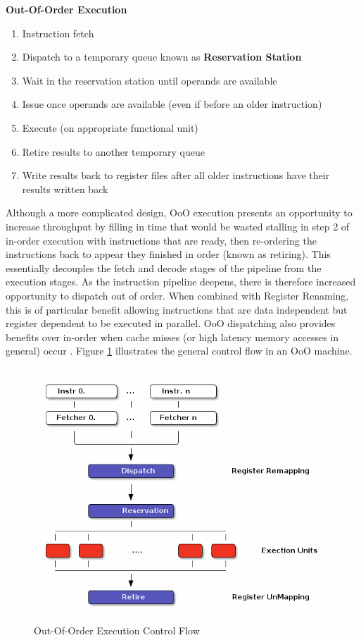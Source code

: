 \documentclass[12pt]{report}
\begin{document}
\newpage

\textbf{Out-Of-Order Execution}
\begin{enumerate}
\item Instruction fetch
\item Dispatch to a temporary queue known as \textbf{Reservation Station}
\item Wait in the reservation station until operands are available
\item Issue once operands are available (even if before an older
instruction)
\item Execute (on appropriate functional unit)
\item Retire results to another temporary queue
\item Write results back to register files after all older instructions have their results written back
\end{enumerate}

Although a more complicated design, OoO execution presents an opportunity to
increase throughput by filling in time that would be wasted stalling in step
2 of in-order execution with instructions that are ready, then re-ordering
the instructions back to appear they finished in order (known as retiring).
This essentially decouples the fetch and decode stages of the pipeline from
the execution stages. As the instruction pipeline deepens, there is therefore
increased opportunity to dispatch out of order. When combined with Register
Renaming, this is of particular benefit allowing instructions that are data
independent but register dependent to be executed in parallel. OoO
dispatching also provides benefits over in-order when cache misses (or high
latency memory accesses in general) occur \parencite{stark1997reducing}.
Figure \ref{fig:OutOfOrder} illustrates the general control flow in an OoO machine.

\begin{figure}[htbp]
\centering
\includegraphics[width=1.0\textwidth]{figures/OoODiagram.png}
\caption{\label{fig:OutOfOrder}Out-Of-Order Execution Control Flow}
\end{figure}
\end{document}
